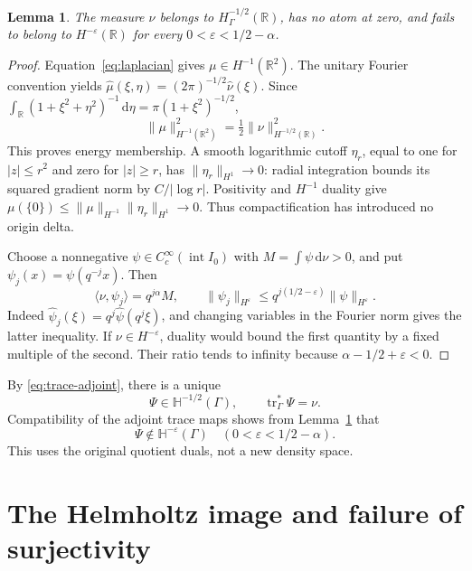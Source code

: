 \documentclass[11pt]{article}
\newtheorem{lemma}[theorem]{Lemma}
\newcommand{\hH}{\mathbb H}
\newcommand{\R}{\mathbb R}
\newcommand{\tr}{\operatorname{tr}}
\newcommand{\dd}{\,\mathrm d}
\begin{document}
\begin{lemma}\label{lem:regularity}
The measure \(\nu\) belongs to \(H^{-1/2}_\Gamma(\R)\), has no atom at
zero, and fails to belong to \(H^{-\varepsilon}(\R)\) for every
\(0<\varepsilon<1/2-\alpha\).
\end{lemma}
\begin{proof}
Equation~\eqref{eq:laplacian} gives \(\mu\in H^{-1}(\R^2)\).
The unitary Fourier convention yields
\(\widehat\mu(\xi,\eta)=(2\pi)^{-1/2}\widehat\nu(\xi)\).
Since
\(\int_\R(1+\xi^2+\eta^2)^{-1}\dd\eta=\pi(1+\xi^2)^{-1/2}\),
\begin{equation}\label{eq:energy-line}
 \|\mu\|_{H^{-1}(\R^2)}^2
       =\tfrac12\|\nu\|_{H^{-1/2}(\R)}^2 .
\end{equation}
This proves energy membership.
A smooth logarithmic cutoff \(\eta_r\), equal to one for \(|z|\le r^2\)
and zero for \(|z|\ge r\), has
\(\|\eta_r\|_{H^1}\to0\): radial integration bounds its squared gradient
norm by \(C/|\log r|\).
Positivity and \(H^{-1}\) duality give
\(\mu(\{0\})\le\|\mu\|_{H^{-1}}\|\eta_r\|_{H^1}\to0\).
Thus compactification has introduced no origin delta.

Choose a nonnegative \(\psi\in C^\infty_c(\operatorname{int}I_0)\) with
\(M=\int\psi\dd\nu>0\), and put \(\psi_j(x)=\psi(q^{-j}x)\).
Then
\[
 \langle\nu,\psi_j\rangle=q^{j\alpha}M,\qquad
 \|\psi_j\|_{H^\varepsilon}
       \le q^{j(1/2-\varepsilon)}\|\psi\|_{H^\varepsilon}.
\]
Indeed \(\widehat\psi_j(\xi)=q^j\widehat\psi(q^j\xi)\), and changing
variables in the Fourier norm gives the latter inequality.
If \(\nu\in H^{-\varepsilon}\), duality would bound the first quantity
by a fixed multiple of the second. Their ratio tends to infinity because
\(\alpha-1/2+\varepsilon<0\).
\end{proof}

By \eqref{eq:trace-adjoint}, there is a unique
\begin{equation}\label{eq:density}
 \Psi\in\hH^{-1/2}(\Gamma),\qquad \tr_\Gamma^*\Psi=\nu .
\end{equation}
Compatibility of the adjoint trace maps shows from
Lemma~\ref{lem:regularity} that
\begin{equation}\label{eq:density-failure}
 \Psi\notin\hH^{-\varepsilon}(\Gamma)
 \quad(0<\varepsilon<1/2-\alpha).
\end{equation}
This uses the original quotient duals, not a new density space.

\section{The Helmholtz image and failure of surjectivity}\label{sec:image}
\end{document}
